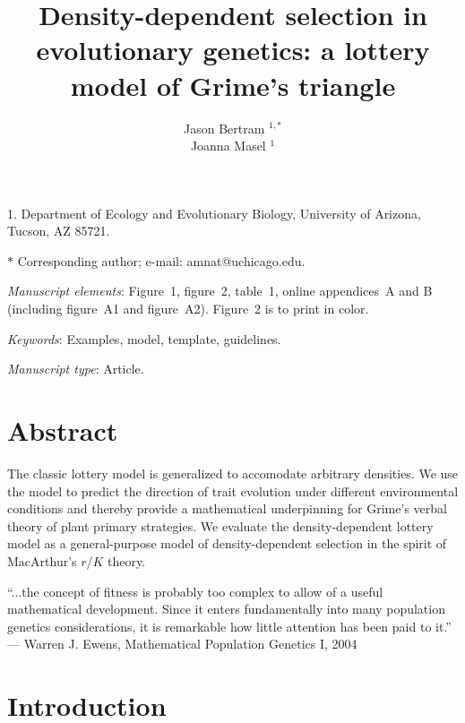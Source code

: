 \documentclass[11pt]{article}
\title{Density-dependent selection in evolutionary genetics: a lottery model of Grime's triangle}
\author{Jason Bertram $^{1,\ast}$ \\ 
Joanna Masel $^{1}$}
\date{}
\begin{document}
\maketitle

\noindent{}1. Department of Ecology and Evolutionary Biology, University of Arizona, Tucson, AZ 85721.

\noindent{}$\ast$ Corresponding author; e-mail: amnat@uchicago.edu.


\bigskip

\textit{Manuscript elements}: Figure~1, figure~2, table~1, online
appendices~A and B (including figure~A1 and figure~A2). Figure~2 is to
print in color.

\bigskip

\textit{Keywords}: Examples, model, template, guidelines.

\bigskip

\textit{Manuscript type}: Article. 

\bigskip


\linenumbers{}
\modulolinenumbers[3]

\newpage{}

\section*{Abstract}

The classic lottery model is generalized to accomodate arbitrary densities. We use the model to predict the direction of trait evolution under different environmental conditions and thereby provide a mathematical underpinning for Grime's verbal theory of plant primary strategies. We evaluate the density-dependent lottery model as a general-purpose model of density-dependent selection in the spirit of MacArthur's $r$/$K$ theory. 

\newpage{}

``...the concept of fitness is probably too complex to allow of a useful mathematical development. Since it enters fundamentally into many population genetics considerations, it is remarkable how little attention has been paid to it.'' --- Warren J. Ewens, Mathematical Population Genetics I, 2004 

\section*{Introduction}
\end{document}
